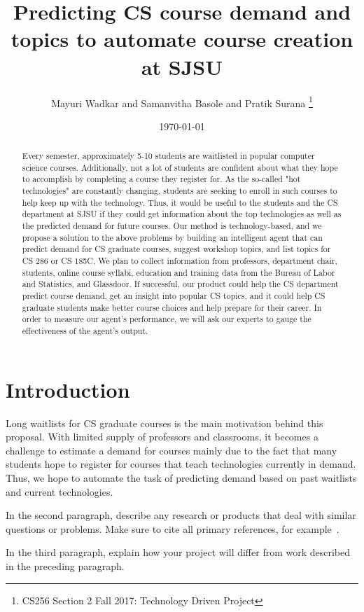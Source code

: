 \documentclass{article}
\title{Predicting CS course demand and topics to automate course creation at SJSU}
\author{Mayuri Wadkar and Samanvitha Basole and Pratik Surana
\thanks{CS256 Section 2 Fall 2017: Technology Driven Project}}
\date{\today}
\begin{document}
\maketitle
\begin{abstract}
Every semester, approximately 5-10 students are waitlisted in popular computer science courses. Additionally, not a lot of students are confident about what they hope to accomplish by completing a course they register for. As the so-called "hot technologies" are constantly changing, students are seeking to enroll in such courses to help keep up with the technology. Thus, it would be useful to the students and the CS department at SJSU if they could get information about the top technologies as well as the predicted demand for future courses. Our method is technology-based, and we propose a solution to the above problems by building an intelligent agent that can predict demand for CS graduate courses, suggest workshop topics, and list topics for CS 286 or CS 185C. We plan to collect information from professors, department chair, students, online course syllabi, education and training data from the Bureau of Labor and Statistics, and Glassdoor. If successful, our product could help the CS department predict course demand, get an insight into popular CS topics, and it could help CS graduate students make better course choices and help prepare for their career. In order to measure our agent's performance, we will ask our experts to gauge the effectiveness of the agent's output. 
\end{abstract}

\section{Introduction}

Long waitlists for CS graduate courses is the main motivation behind this proposal. With limited supply of professors and classrooms, it becomes a challenge to estimate a demand for courses mainly due to the fact that many students hope to register for courses that teach technologies currently in demand. Thus, we hope to automate the task of predicting demand based on past waitlists and current technologies. 

In the second paragraph, describe any research or products that deal with similar questions or problems.  Make sure to cite all primary references, for example~\cite{einstein}.

In the third paragraph, explain how your project will differ from work described in the preceding paragraph. 
\end{document}
